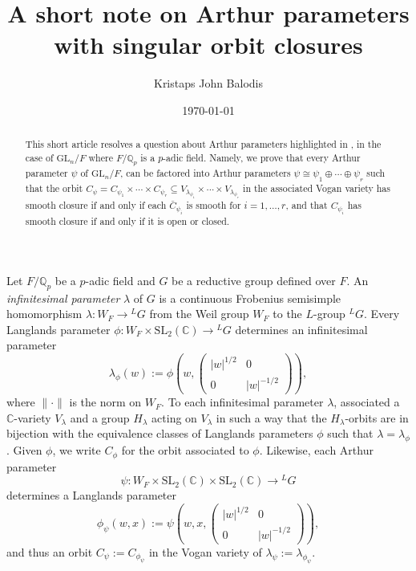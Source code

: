 \documentclass[12pt]{amsart}
\title{A short note on Arthur parameters with singular orbit closures}
\author{Kristaps John Balodis}
\date{\today}
\newcommand\norm[1]{\lVert#1\rVert}
\theoremstyle{plain}
\theoremstyle{definition}
\newcommand{\lb}{\left(}
\newcommand{\rb}{\right)}
\newcommand{\bc}{\mathbb{C}}
\newcommand{\bq}{\mathbb{Q}}
\newcommand{\1}{\mathbbm{1}}
\newcommand{\GL}{\mathrm{GL}}
\newcommand{\SL}{\mathrm{SL}}
\begin{document}
	
	\maketitle
	
	
	\begin{abstract}
		This short article resolves a question about Arthur parameters highlighted in \cite[Section 2.2]{BCFZ}, in the case of $\GL_n/F$ where $F/\bq_p$ is a $p$-adic field.  
		Namely, we prove that every Arthur parameter $\psi$ of $\GL_n/F$, can be factored into Arthur parameters $\psi\cong \psi_1\oplus\cdots \oplus\psi_r$ such that the orbit $C_\psi=C_{\psi_1}\times\cdots\times  C_{\psi_r}\subseteq V_{\lambda_{\psi_1}}\times \cdots \times V_{\lambda_{\psi_r}}$ in the associated Vogan variety has smooth closure if and only if each $\bar{C}_{\psi_i}$ is smooth for $i=1, \ldots, r$, and that $C_{\psi_i}$ has smooth closure if and only if it is open or closed. 
	\end{abstract}
	
	Let $F/\bq_p$ be a $p$-adic field and $G$ be a reductive group defined over $F$.  
	An \emph{infinitesimal parameter} $\lambda$ of $G$ is a continuous Frobenius semisimple homomorphism $\lambda:W_F\to {}^LG$ from the Weil group $W_F$ to the $L$-group ${}^LG$.  
	Every Langlands parameter $\phi:W_F\times\SL_2(\bc)\to {}^LG$ determines an infinitesimal parameter 
	$$\lambda_\phi(w):=\phi\lb w, \begin{pmatrix}
		|w|^{1/2} & 0 \\
		0 & |w|^{-1/2}
	\end{pmatrix}\rb,$$
	where $\norm{\cdot}$ is the norm on $W_F$.  
	To each infinitesimal parameter $\lambda$, \cite{Vog} associated a $\bc$-variety $V_\lambda$ and a group $H_\lambda$ acting on $V_\lambda$ in such a way that the $H_\lambda$-orbits are in bijection with the equivalence classes of Langlands parameters $\phi$ such that $\lambda=\lambda_\phi$. 
	Given $\phi$, we write $C_\phi$ for the orbit associated to $\phi$.  
	Likewise, each Arthur parameter 
	$$\psi:W_F\times\SL_2(\bc)\times\SL_2(\bc)\to {}^LG$$
	determines a Langlands parameter 
	$$\phi_\psi(w, x):=\psi\lb w, x, \begin{pmatrix}
		|w|^{1/2} & 0 \\
		0 & |w|^{-1/2}
	\end{pmatrix}\rb,$$
	and thus an orbit $C_\psi:=C_{\phi_\psi}$ in the Vogan variety of $\lambda_\psi:=\lambda_{\phi_\psi}$. 
	
\end{document}
